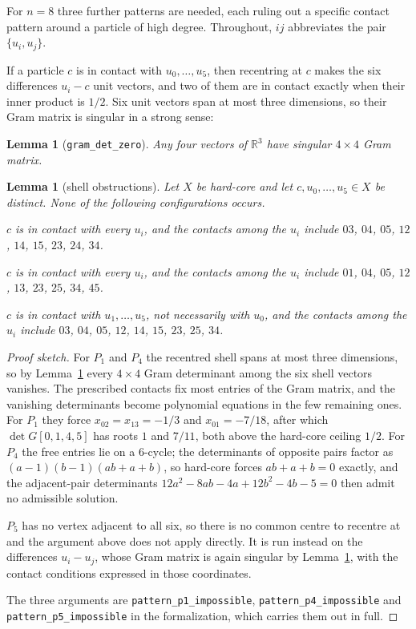 \documentclass[11pt,a4paper]{article}
\theoremstyle{plain}
\newtheorem{lemma}[theorem]{Lemma}
\theoremstyle{definition}
\newcommand{\R}{\mathbb{R}}
\begin{document}
For $n = 8$ three further patterns are needed, each ruling out a specific contact
pattern around a particle of high degree. Throughout, $ij$ abbreviates the pair
$\{u_i, u_j\}$.

If a particle $c$ is in contact with $u_0,\dots,u_5$, then recentring at $c$ makes the
six differences $u_i - c$ unit vectors, and two of them are in contact exactly when
their inner product is $1/2$. Six unit vectors span at most three dimensions, so their
Gram matrix is singular in a strong sense:

\begin{lemma}[\texttt{gram\_det\_zero}]
\label{lem:gram}
Any four vectors of $\R^3$ have singular $4 \times 4$ Gram matrix.
\end{lemma}

\begin{lemma}[shell obstructions]
\label{lem:patterns}
Let $X$ be hard-core and let $c, u_0, \dots, u_5 \in X$ be distinct. None of the
following configurations occurs.
\begin{description}[leftmargin=0pt, itemsep=3pt, font=\normalfont\itshape]
\item[$P_1$.] $c$ is in contact with every $u_i$, and the contacts among the $u_i$
  include $03$, $04$, $05$, $12$, $14$, $15$, $23$, $24$, $34$.
\item[$P_4$.] $c$ is in contact with every $u_i$, and the contacts among the $u_i$
  include $01$, $04$, $05$, $12$, $13$, $23$, $25$, $34$, $45$.
\item[$P_5$.] $c$ is in contact with $u_1, \dots, u_5$, not necessarily with $u_0$, and
  the contacts among the $u_i$ include $03$, $04$, $05$, $12$, $14$, $15$, $23$, $25$, $34$.
\end{description}
\end{lemma}

\begin{proof}[Proof sketch]
For $P_1$ and $P_4$ the recentred shell spans at most three dimensions, so by
Lemma~\ref{lem:gram} every $4 \times 4$ Gram determinant among the six shell vectors
vanishes. The prescribed contacts fix most entries of the Gram matrix, and the
vanishing determinants become polynomial equations in the few remaining ones. For
$P_1$ they force $x_{02} = x_{13} = -1/3$ and $x_{01} = -7/18$, after which
$\det G[0,1,4,5]$ has roots $1$ and $7/11$, both above the hard-core ceiling $1/2$.
For $P_4$ the free entries lie on a $6$-cycle; the determinants of opposite pairs
factor as $(a-1)(b-1)(ab+a+b)$, so hard-core forces $ab + a + b = 0$ exactly, and the
adjacent-pair determinants $12a^2 - 8ab - 4a + 12b^2 - 4b - 5 = 0$ then admit no
admissible solution.

$P_5$ has no vertex adjacent to all six, so there is no common centre to recentre at
and the argument above does not apply directly. It is run instead on the differences
$u_i - u_j$, whose Gram matrix is again singular by Lemma~\ref{lem:gram}, with the
contact conditions expressed in those coordinates.

The three arguments are \texttt{pattern\_p1\_impossible},
\texttt{pattern\_p4\_impossible} and \texttt{pattern\_p5\_impossible} in the
formalization, which carries them out in full.
\end{proof}
\end{document}

